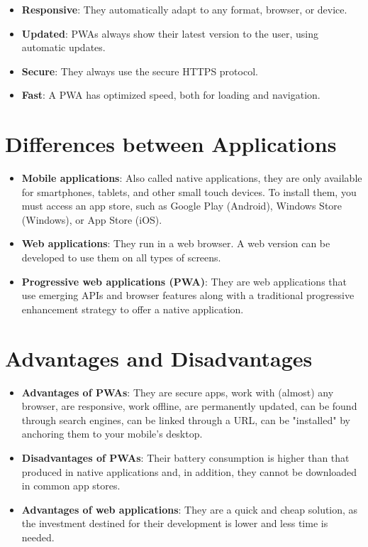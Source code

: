 \documentclass[12pt]{article}
\begin{document}
	\begin{itemize}
		\item \textbf{Responsive}: They automatically adapt to any format, browser, or device.
		\item \textbf{Updated}: PWAs always show their latest version to the user, using automatic updates.
		\item \textbf{Secure}: They always use the secure HTTPS protocol.
		\item \textbf{Fast}: A PWA has optimized speed, both for loading and navigation.
	\end{itemize}
	
	\section{Differences between Applications}
	\begin{itemize}
		\item \textbf{Mobile applications}: Also called native applications, they are only available for smartphones, tablets, and other small touch devices. To install them, you must access an app store, such as Google Play (Android), Windows Store (Windows), or App Store (iOS).
		\item \textbf{Web applications}: They run in a web browser. A web version can be developed to use them on all types of screens.
		\item \textbf{Progressive web applications (PWA)}: They are web applications that use emerging APIs and browser features along with a traditional progressive enhancement strategy to offer a native application.
	\end{itemize}
	
	\section{Advantages and Disadvantages}
	\begin{itemize}
		\item \textbf{Advantages of PWAs}: They are secure apps, work with (almost) any browser, are responsive, work offline, are permanently updated, can be found through search engines, can be linked through a URL, can be "installed" by anchoring them to your mobile's desktop.
		\item \textbf{Disadvantages of PWAs}: Their battery consumption is higher than that produced in native applications and, in addition, they cannot be downloaded in common app stores.
		\item \textbf{Advantages of web applications}: They are a quick and cheap solution, as the investment destined for their development is lower and less time is needed.
	\end{itemize}
\end{document}
